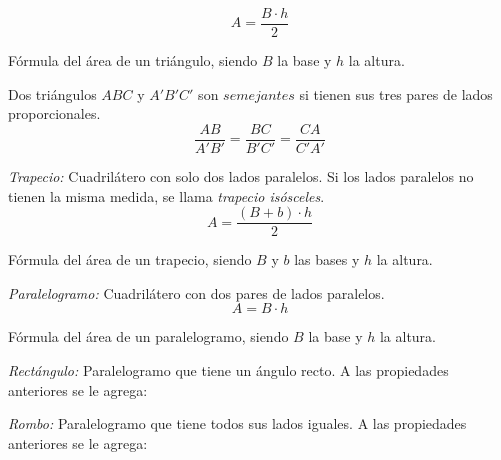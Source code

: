 $$\boxed{A = \frac{B \cdot h}{2}}$$
\begin{center}
    Fórmula del área de un triángulo, siendo $B$ la base y $h$ la altura.
\end{center}

\noindent Dos triángulos $ABC$ y $A'B'C'$ son $semejantes$ si tienen sus tres pares de lados proporcionales.
$$\frac{AB}{A'B'} = \frac{BC}{B'C'} = \frac{CA}{C'A'}$$

\emph{Trapecio:} Cuadrilátero con solo dos lados paralelos. Si los lados paralelos no tienen la misma medida, se llama \emph{trapecio isósceles}.\\
$$\boxed{A = \frac{(B+b)\cdot h}{2}}$$
\begin{center}
    Fórmula del área de un trapecio, siendo $B$ y $b$ las bases y $h$ la altura.
\end{center}

\emph{Paralelogramo:} Cuadrilátero con dos pares de lados paralelos.\\
$$\boxed{A = B \cdot h}$$
\begin{center}
    Fórmula del área de un paralelogramo, siendo $B$ la base y $h$ la altura.
\end{center}

\noindent \emph{Rectángulo:} Paralelogramo que tiene un ángulo recto. A las propiedades anteriores se le agrega:

\noindent \emph{Rombo:} Paralelogramo que tiene todos sus lados iguales. A las propiedades anteriores se le agrega:

